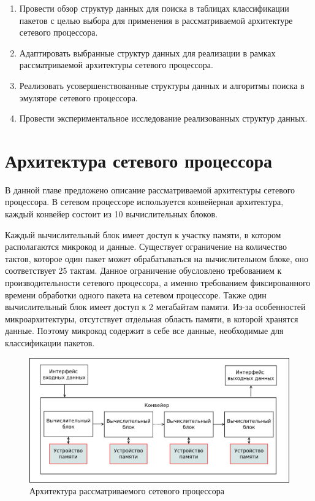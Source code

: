 \documentclass[a4paper, 12pt, titlepage, finall]{extreport}
\begin{document}
        \begin{enumerate}
            \item Провести обзор структур данных для поиска в таблицах классификации пакетов с целью выбора для применения в рассматриваемой архитектуре сетевого процессора.
            \item Адаптировать выбранные структур данных для реализации в рамках рассматриваемой архитектуры сетевого процессора.
            \item Реализовать усовершенствованные структуры данных и алгоритмы поиска в эмуляторе сетевого процессора.
            \item Провести экспериментальное исследование реализованных структур данных.
        \end{enumerate}
       
    \chapter{Архитектура сетевого процессора}
        В данной главе предложено описание рассматриваемой архитектуры сетевого процессора.
        В сетевом процессоре используется конвейерная архитектура, каждый конвейер состоит из 10 вычислительных блоков. 
         
        Каждый вычислительный блок имеет доступ к участку памяти, в котором располагаются микрокод и данные.
        Существует ограничение на количество тактов, которое один пакет может обрабатываться на вычислительном блоке, оно соответствует 25 тактам.
        Данное ограничение обусловлено требованием к производительности сетевого процессора, а именно требованием фиксированного времени обработки одного пакета на сетевом процессоре.
        Также один вычислительный блок имеет доступ к 2 мегабайтам памяти.
        Из-за особенностей микроархитектуры, отсутствует отдельная область памяти, в которой хранятся данные. Поэтому микрокод содержит в себе все данные,
        необходимые для классификации пакетов.

        \begin{figure}[h]
            \includegraphics[width=\textwidth]{npu_all.png}
            \caption{Архитектура рассматриваемого сетевого процессора}
        \end{figure}
        
\end{document}
